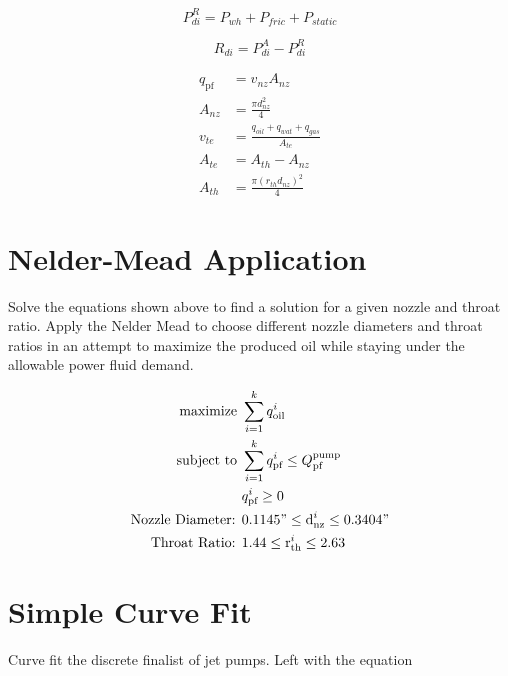 \documentclass[12 pt]{report}
\begin{document}
\begin{equation}
P_{di}^R = P_{wh} + P_{fric} + P_{static}
\label{pdi_req}
\end{equation}

\begin{equation}
R_{di} = P_{di}^A - P_{di}^R
\label{res_disch}
\end{equation}

\begin{equation*}
\begin{align}
    q_{\text{pf}} &= v_{nz} A_{nz} \\
    A_{nz} &= \frac{\pi d_{nz}^{2}}{4} \\
    v_{te} &= \frac{q_{oil}+q_{wat}+q_{gas}}{A_{te}} \\
    A_{te} &= A_{th} - A_{nz} \\
    A_{th} &= \frac{\pi (r_{th}d_{nz})^{2}}{4}
\end{align}
\end{equation*}

\section{Nelder-Mead Application}

Solve the equations shown above to find a solution for a given nozzle and throat ratio. Apply the Nelder Mead to choose different nozzle diameters and throat ratios in an attempt to maximize the produced oil while staying under the allowable power fluid demand.

\begin{equation*}
\begin{aligned}
    \text{maximize } & \sum_{i=1}^{k} q_{\text{oil}}^{i} \\
    \text{subject to } & \sum_{i=1}^{k} q_{\text{pf}}^{i} \leq Q_{\text{pf}}^{\text{pump}} \\
    & q_{\text{pf}}^{i} \geq 0 \\
    \text{Nozzle Diameter: } & 0.1145" \leq \text{d}_{\text{nz}}^{i} \leq 0.3404"  \\
    \text{Throat Ratio: } &  1.44 \leq \text{r}_{\text{th}}^{i} \leq 2.63
\end{aligned}
\end{equation*}

\section{Simple Curve Fit}

Curve fit the discrete finalist of jet pumps. Left with the equation 
\end{document}
